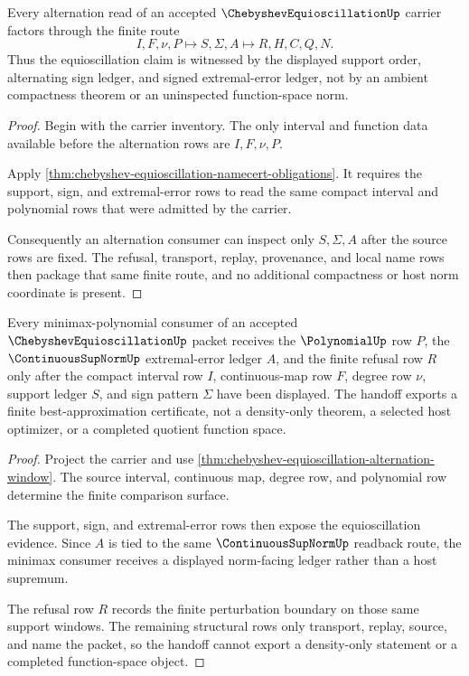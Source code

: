 \begin{theorem}
\label{thm:chebyshev-equioscillation-alternation-window}
Every alternation read of an accepted $\ChebyshevEquioscillationUp$ carrier factors through the finite route
$$
I,F,\nu,P \longmapsto S,\Sigma,A \longmapsto R,H,C,Q,N .
$$
Thus the equioscillation claim is witnessed by the displayed support order, alternating sign ledger, and signed extremal-error ledger, not by an ambient compactness theorem or an uninspected function-space norm.
\end{theorem}
\begin{proof}
Begin with the carrier inventory. The only interval and function data available before the alternation rows are $I,F,\nu,P$.

Apply \autoref{thm:chebyshev-equioscillation-namecert-obligations}. It requires the support, sign, and extremal-error rows to read the same compact interval and polynomial rows that were admitted by the carrier.

Consequently an alternation consumer can inspect only $S,\Sigma,A$ after the source rows are fixed. The refusal, transport, replay, provenance, and local name rows then package that same finite route, and no additional compactness or host norm coordinate is present.
\end{proof}

\begin{theorem}
\label{thm:chebyshev-equioscillation-minimax-handoff}
Every minimax-polynomial consumer of an accepted $\ChebyshevEquioscillationUp$ packet receives the $\PolynomialUp$ row $P$, the $\ContinuousSupNormUp$ extremal-error ledger $A$, and the finite refusal row $R$ only after the compact interval row $I$, continuous-map row $F$, degree row $\nu$, support ledger $S$, and sign pattern $\Sigma$ have been displayed. The handoff exports a finite best-approximation certificate, not a density-only theorem, a selected host optimizer, or a completed quotient function space.
\end{theorem}
\begin{proof}
Project the carrier and use \autoref{thm:chebyshev-equioscillation-alternation-window}. The source interval, continuous map, degree row, and polynomial row determine the finite comparison surface.

The support, sign, and extremal-error rows then expose the equioscillation evidence. Since $A$ is tied to the same $\ContinuousSupNormUp$ readback route, the minimax consumer receives a displayed norm-facing ledger rather than a host supremum.

The refusal row $R$ records the finite perturbation boundary on those same support windows. The remaining structural rows only transport, replay, source, and name the packet, so the handoff cannot export a density-only statement or a completed function-space object.
\end{proof}

